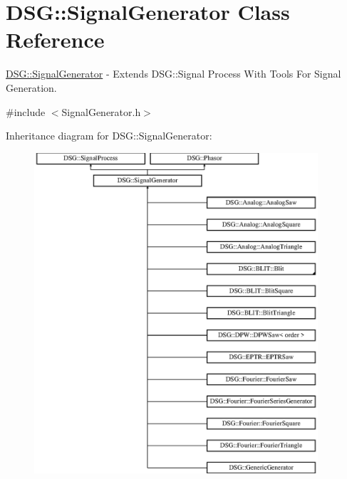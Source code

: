 \hypertarget{class_d_s_g_1_1_signal_generator}{\section{D\+S\+G\+:\+:Signal\+Generator Class Reference}
\label{class_d_s_g_1_1_signal_generator}
}


\hyperlink{class_d_s_g_1_1_signal_generator}{D\+S\+G\+::\+Signal\+Generator} -\/ Extends D\+S\+G\+::\+Signal Process With Tools For Signal Generation.  




{\ttfamily \#include $<$Signal\+Generator.\+h$>$}

Inheritance diagram for D\+S\+G\+:\+:Signal\+Generator\+:\begin{figure}[H]
\begin{center}
\leavevmode
\includegraphics[height=11.914893cm]{class_d_s_g_1_1_signal_generator}
\end{center}
\end{figure}
